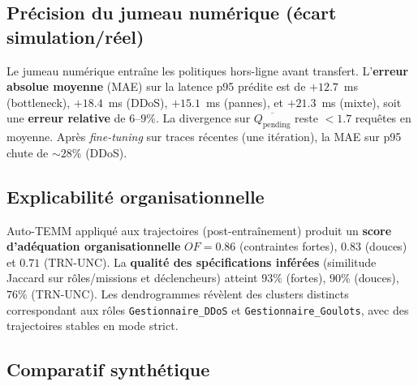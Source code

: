 \subsection*{Précision du jumeau numérique (écart simulation/réel)}

Le jumeau numérique entraîne les politiques hors-ligne avant transfert.
L’\textbf{erreur absolue moyenne} (MAE) sur la latence p95 prédite est de $+12.7$~ms (bottleneck), $+18.4$~ms (DDoS), $+15.1$~ms (pannes), et $+21.3$~ms (mixte), soit une \textbf{erreur relative} de $6$--$9\%$.
La divergence sur $\overline{Q_{\text{pending}}}$ reste $<1.7$ requêtes en moyenne.
Après \textit{fine-tuning} sur traces récentes (une itération), la MAE sur p95 chute de $\sim 28\%$ (DDoS).

\subsection*{Explicabilité organisationnelle}

Auto-TEMM appliqué aux trajectoires (post-entraînement) produit un \textbf{score d’adéquation organisationnelle} $OF=0.86$ (contraintes fortes), $0.83$ (douces) et $0.71$ (TRN-UNC).
La \textbf{qualité des spécifications inférées} (similitude Jaccard sur rôles/missions et déclencheurs) atteint $93\%$ (fortes), $90\%$ (douces), $76\%$ (TRN-UNC).
Les dendrogrammes révèlent des clusters distincts correspondant aux rôles \texttt{Gestionnaire\_DDoS} et \texttt{Gestionnaire\_Goulots}, avec des trajectoires stables en mode strict.

\subsection*{Comparatif synthétique}

